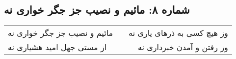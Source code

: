 \begin{center}
\section*{شماره ۸: مائیم و نصیب جز جگر خواری نه}
\label{sec:008}
\begin{longtable}{l p{0.5cm} r}
مائیم و نصیب جز جگر خواری نه
&&
وز هیچ کسی به ذرهای یاری نه
\\
از مستی جهل امید هشیاری نه
&&
وز رفتن و آمدن خبرداری نه
\\
\end{longtable}
\end{center}
